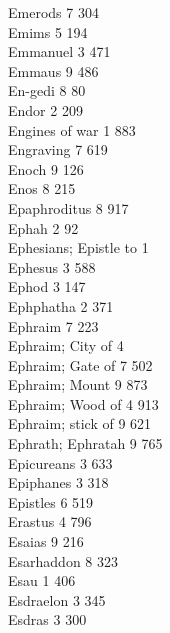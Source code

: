 Emerods \hfill 7 \quad \phantom{0}304\\
Emims \hfill 5 \quad \phantom{0}194\\
Emmanuel \hfill 3 \quad \phantom{0}471\\
Emmaus \hfill 9 \quad \phantom{0}486\\
En-gedi \hfill 8 \quad \phantom{0}\phantom{0}80\\
Endor \hfill 2 \quad \phantom{0}209\\
Engines of war \hfill 1 \quad \phantom{0}883\\
Engraving \hfill 7 \quad \phantom{0}619\\
Enoch \hfill 9 \quad \phantom{0}126\\
Enos \hfill 8 \quad \phantom{0}215\\
Epaphroditus \hfill 8 \quad \phantom{0}917\\
Ephah \hfill 2 \quad \phantom{0}\phantom{0}92\\
Ephesians; Epistle to \hfill 1 \\
Ephesus \hfill 3 \quad \phantom{0}588\\
Ephod \hfill 3 \quad \phantom{0}147\\
Ephphatha \hfill 2 \quad \phantom{0}371\\
Ephraim \hfill 7 \quad \phantom{0}223\\
Ephraim; City of \hfill 4 \\
Ephraim; Gate of \hfill 7 \quad \phantom{0}502\\
Ephraim; Mount \hfill 9 \quad \phantom{0}873\\
Ephraim; Wood of \hfill 4 \quad \phantom{0}913\\
Ephraim; stick of \hfill 9 \quad \phantom{0}621\\
Ephrath; Ephratah \hfill 9 \quad \phantom{0}765\\
Epicureans \hfill 3 \quad \phantom{0}633\\
Epiphanes \hfill 3 \quad \phantom{0}318\\
Epistles \hfill 6 \quad \phantom{0}519\\
Erastus \hfill 4 \quad \phantom{0}796\\
Esaias \hfill 9 \quad \phantom{0}216\\
Esarhaddon \hfill 8 \quad \phantom{0}323\\
Esau \hfill 1 \quad \phantom{0}406\\
Esdraelon \hfill 3 \quad \phantom{0}345\\
Esdras \hfill 3 \quad \phantom{0}300\\
